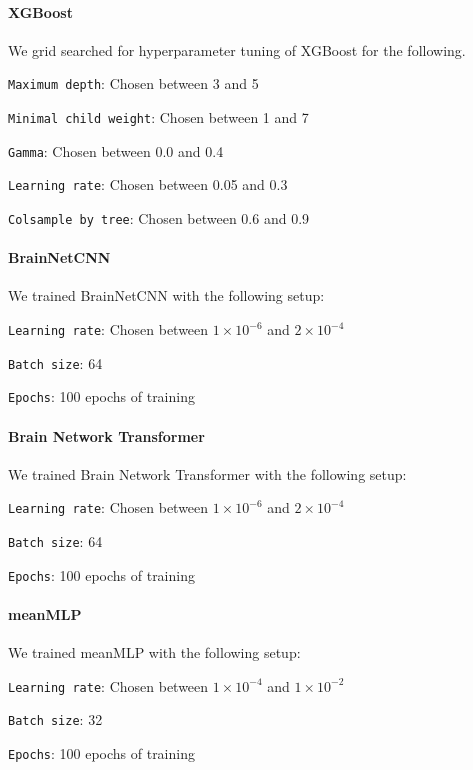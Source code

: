 \paragraph{XGBoost}
We grid searched for hyperparameter tuning of XGBoost for the following.
\begin{compactitem}
    \item \texttt{Maximum depth}: Chosen between 3 and 5
    \item \texttt{Minimal child weight}: Chosen between 1 and 7
    \item \texttt{Gamma}: Chosen between 0.0 and 0.4
    \item \texttt{Learning rate}: Chosen between 0.05 and 0.3
    \item \texttt{Colsample by tree}: Chosen between 0.6 and 0.9
\end{compactitem}

\paragraph{BrainNetCNN}
We trained BrainNetCNN with the following setup: 
\begin{compactitem}
    \item \texttt{Learning rate}: Chosen between $1\times10^{-6}$ and $2\times10^{-4}$ 
    \item \texttt{Batch size}: 64
    \item \texttt{Epochs}: 100 epochs of training
\end{compactitem}

\paragraph{Brain Network Transformer}
We trained Brain Network Transformer with the following setup: 
\begin{compactitem}
    \item \texttt{Learning rate}: Chosen between $1\times10^{-6}$ and $2\times10^{-4}$ 
    \item \texttt{Batch size}: 64
    \item \texttt{Epochs}: 100 epochs of training
\end{compactitem}

\paragraph{meanMLP}
We trained meanMLP with the following setup: 
\begin{compactitem}
    \item \texttt{Learning rate}: Chosen between $1\times10^{-4}$ and $1\times10^{-2}$ 
    \item \texttt{Batch size}: 32
    \item \texttt{Epochs}: 100 epochs of training
\end{compactitem}

